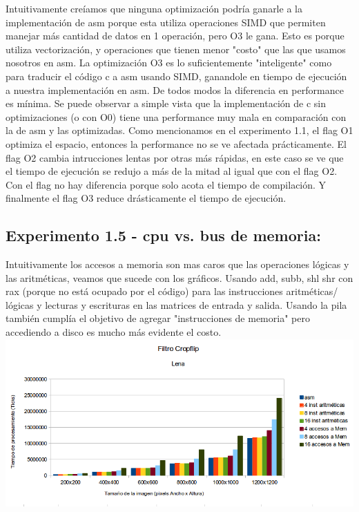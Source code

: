 \documentclass[a4paper]{article}
\begin{document}
Intuitivamente creíamos que ninguna optimización podría ganarle a la implementación de asm porque esta utiliza operaciones SIMD que permiten manejar más cantidad de datos en 1 operación, pero O3 le gana.
Esto es porque utiliza vectorización, y operaciones que tienen menor "costo" que las que usamos nosotros en asm.
La optimización O3 es lo suficientemente "inteligente" como para traducir el código c a asm usando SIMD, ganandole en tiempo de ejecución a nuestra implementación en asm.\newline
De todos modos la diferencia en performance es mínima. \newline
Se puede observar a simple vista que la implementación de c sin optimizaciones (o con O0) tiene una performance muy mala en comparación con la de asm y las optimizadas.
Como mencionamos en el experimento 1.1, el flag O1 optimiza el espacio, entonces la performance no se ve afectada prácticamente.
El flag O2 cambia intrucciones lentas por otras más rápidas, en este caso se ve que el tiempo de ejecución se redujo a más de la mitad al igual que con el flag O2.
Con el flag no hay diferencia porque solo acota el tiempo de compilación.
Y finalmente el flag O3 reduce drásticamente el tiempo de ejecución. 
\newline


\subsection{Experimento 1.5 - cpu vs. bus de memoria:}

Intuitivamente los accesos a memoria son mas caros que las operaciones lógicas y las aritméticas, veamos que sucede con los gráficos.
\newline
Usando add, subb, shl shr con rax (porque no está ocupado por el código) para las instrucciones aritméticas/ lógicas
y lecturas y escrituras en las matrices de entrada y salida.\newline
Usando la pila también cumplía el objetivo de agregar "instrucciones de memoria" pero accediendo a disco es mucho más evidente el costo.\newline
\includegraphics[width=\textwidth,height=\textheight,keepaspectratio
]{graficoMenVsArit.png}
\begin {flushleft}
\end{flushleft}
\end{document}
